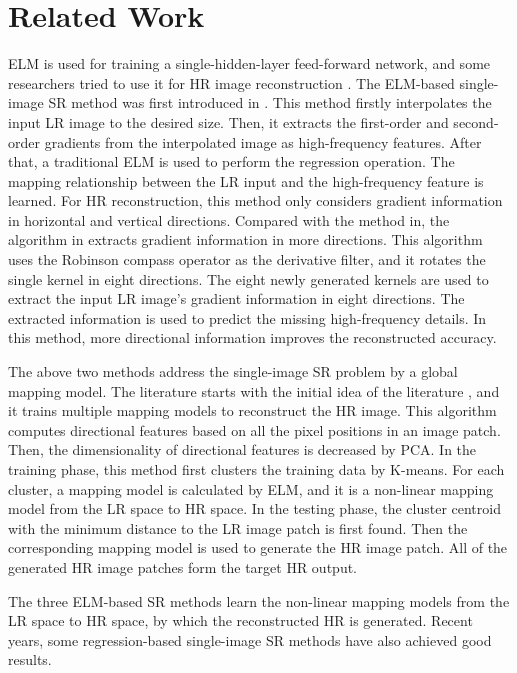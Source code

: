 \documentclass[review,numbers,sort&compress]{elsarticle}  %
\begin{document}
\section{Related Work}
ELM is used for training a single-hidden-layer feed-forward network, and some researchers tried to use it for HR image reconstruction \cite{an2012image} \cite{sidike2017fast} \cite{cosmo2017single}. The ELM-based single-image SR method was first introduced in \cite{an2012image}. This method firstly interpolates the input LR image to the desired size.  Then, it extracts the first-order and second-order gradients from the interpolated image as high-frequency features. After that, a traditional ELM is used to perform the regression operation. The mapping relationship between the LR input and the high-frequency feature is learned. For HR reconstruction, this method only considers gradient information in horizontal and vertical directions. Compared with the method in\cite{an2012image}, the algorithm in \cite{sidike2017fast} extracts gradient information in more directions. This algorithm uses the Robinson compass operator as the derivative filter, and it rotates the single kernel in eight directions. The eight newly generated kernels are used to extract the input LR image’s gradient information in eight directions. The extracted information is used to predict the missing high-frequency details. In this method, more directional information improves the reconstructed accuracy.

The above two methods address the single-image SR problem by a global mapping model. The literature \cite{cosmo2017single} starts with the initial idea of the literature \cite{an2012image}, and it trains multiple mapping models to reconstruct the HR image. This algorithm computes directional features based on all the pixel positions in an image patch. Then, the dimensionality of directional features is decreased by PCA. In the training phase, this method first clusters the training data by K-means. For each cluster, a mapping model is calculated by ELM, and it is a non-linear mapping model from the LR space to HR space. In the testing phase, the cluster centroid with the minimum distance to the LR image patch is first found. Then the corresponding mapping model is used to generate the HR image patch. All of the generated HR image patches form the target HR output.

The three ELM-based SR methods \cite{an2012image} \cite{sidike2017fast} \cite{cosmo2017single} learn the non-linear mapping models from the LR space to HR space, by which the reconstructed HR is generated. Recent years, some regression-based single-image SR methods have also achieved good results.
\end{document}
